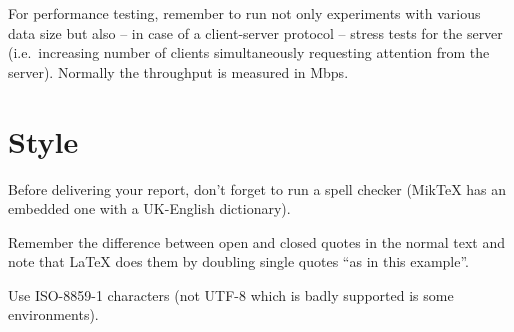 \documentclass[a4paper,12pt]{article}
\def\ie{i.e.\xspace}
\begin{document}
For performance testing, remember to run not only experiments with various data size but also -- in case of a client-server protocol -- stress tests for the server (\ie\ increasing number of clients simultaneously requesting attention from the server).
Normally the throughput is measured in \si{\mega bps}.

\section{Style}

Before delivering your report, don't forget to run a spell checker (MikTeX has an embedded one with a UK-English dictionary).

Remember the difference between open and closed quotes in the normal text and note that LaTeX does them by doubling single quotes ``as in this example''.

Use ISO-8859-1 characters (not UTF-8 which is badly supported is some environments).


%



\end{document}
